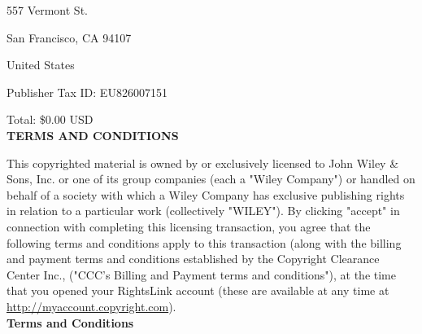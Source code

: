 557 Vermont St.

San Francisco, CA 94107

United States

\noindent Publisher Tax ID: EU826007151

\noindent Total: \$0.00 USD\\

\noindent \textbf{TERMS AND CONDITIONS}

This copyrighted material is owned by or exclusively licensed to John Wiley \& Sons, Inc. or one of its group companies (each a "Wiley Company") or handled on behalf of a society with which a Wiley Company has exclusive publishing rights in relation to a particular work (collectively "WILEY"). By clicking "accept" in connection with completing this licensing transaction, you agree that the following terms and conditions apply to this transaction (along with the billing and payment terms and conditions established by the Copyright Clearance Center Inc., ("CCC's Billing and Payment terms and conditions"), at the time that you opened your RightsLink account (these are available at any time at \url{http://myaccount.copyright.com}).\\

\noindent \textbf{Terms and Conditions}

